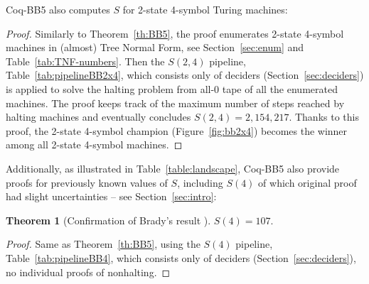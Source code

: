 \documentclass[a4paper,british]{article}
\theoremstyle{definition} %
\newtheorem{theorem}{Theorem}[section]
\numberwithin{equation}{section}
\theoremstyle{definition} %
\newcommand{\BBtheFourth}{107}
\newcommand{\BBTxFTNF}{2{,}154{,}217}
\newcommand{\CoqBB}{Coq-BB5\xspace}
\begin{document}
\CoqBB also computes $S$ for 2-state 4-symbol Turing machines:

\thBBTxF*

\begin{proof}
    Similarly to Theorem~\ref{th:BB5}, the \Coq proof enumerates 2-state 4-symbol machines in (almost) Tree Normal Form, see Section~\ref{sec:enum} and Table~\ref{tab:TNF-numbers}. Then the $S(2,4)$ pipeline, Table~\ref{tab:pipelineBB2x4}, which consists only of deciders (Section~\ref{sec:deciders}) is applied to solve the halting problem from all-0 tape of all the enumerated machines. The proof keeps track of the maximum number of steps reached by halting machines and eventually concludes $S(2,4) = \BBTxFTNF$. Thanks to this proof, the 2-state 4-symbol champion (Figure~\ref{fig:bb2x4}) becomes the winner among all 2-state 4-symbol machines.
\end{proof}

Additionally, as illustrated in Table~\ref{table:landscape}, \CoqBB also provide \Coq proofs for previously known values of $S$, including $S(4)$ of which original proof \cite{Brady83} had slight uncertainties -- see Section~\ref{sec:intro}:

\begin{theorem}[Confirmation of Brady's result \cite{Brady83}]\label{th:BB4}
    $S(4) = \BBtheFourth$.
\end{theorem}
\begin{proof}
    Same as Theorem~\ref{th:BB5}, using the $S(4)$ pipeline, Table~\ref{tab:pipelineBB4}, which consists only of deciders (Section~\ref{sec:deciders}), \ie no individual proofs of nonhalting.
\end{proof}

\newpage
\end{document}
